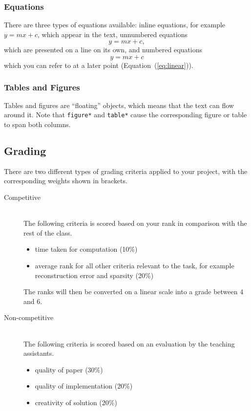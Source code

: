 \subsubsection{Equations}

There are three types of equations available: inline equations, for
example $y=mx + c$, which appear in the text, unnumbered equations
$$y=mx + c,$$
which are presented on a line on its own, and numbered equations
\begin{equation}
  \label{eq:linear}
  y = mx + c
\end{equation}
which you can refer to at a later point (Equation~(\ref{eq:linear})).

\subsubsection{Tables and Figures}

Tables and figures are ``floating'' objects, which means that the text
can flow around it.
Note
that \texttt{figure*} and \texttt{table*} cause the corresponding
figure or table to span both columns.


\subsection{Grading}

There are two different types of grading criteria applied to your
project, with the corresponding weights shown in brackets.
\begin{description}
\item[Competitive] \ \\
  The following criteria is scored based on your rank
  in comparison with the rest of the class.
  \begin{itemize}
  \item time taken for computation (10\%)
  \item average rank for all other criteria relevant to the task, for
    example reconstruction error and sparsity (20\%)
  \end{itemize}
  The ranks will then be converted on a linear scale into a grade
  between 4 and 6.
\item[Non-competitive] \ \\
  The following criteria is scored based on an
  evaluation by the teaching assistants.
  \begin{itemize}
  \item quality of paper (30\%)
  \item quality of implementation (20\%)
  \item creativity of solution (20\%)
  \end{itemize}
\end{description}

